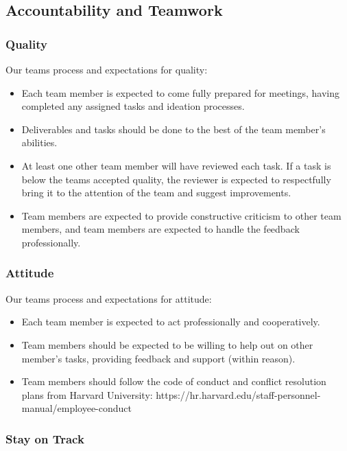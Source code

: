 \documentclass{article}
\begin{document}
\subsection*{Accountability and Teamwork}

\subsubsection*{Quality} 

Our teams process and expectations for quality:
\begin{itemize}
    \item Each team member is expected to come fully prepared for meetings, having completed any assigned tasks and ideation processes. 
    \item Deliverables and tasks should be done to the best of the team member's abilities.
    \item At least one other team member will have reviewed each task. If a task is below the teams accepted quality, the reviewer is expected to respectfully bring it to the attention of the team and suggest improvements.
    \item Team members are expected to provide constructive criticism to other team members, and team members are expected to handle the feedback professionally. 
\end{itemize}

\subsubsection*{Attitude}

Our teams process and expectations for attitude:
\begin{itemize}
    \item Each team member is expected to act professionally and cooperatively.
    \item Team members should be expected to be willing to help out on other member's tasks, providing feedback and support (within reason).
    \item Team members should follow the code of conduct and conflict resolution plans from Harvard University:  https://hr.harvard.edu/staff-personnel-manual/employee-conduct
\end{itemize}


\subsubsection*{Stay on Track}
\end{document}
